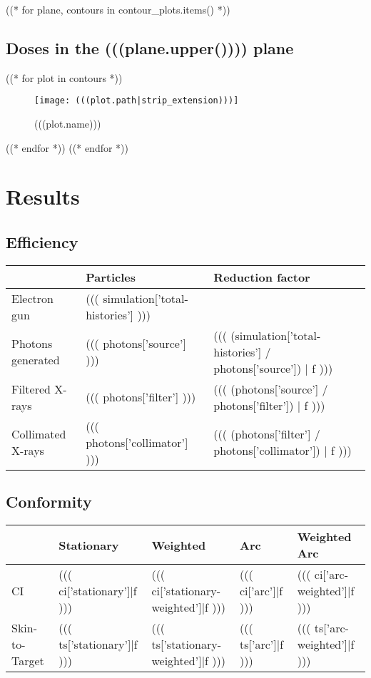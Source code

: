 \documentclass[12pt]{article}
\begin{document}

((* for plane, contours in contour_plots.items() *))
	\subsection{Doses in the (((plane.upper()))) plane}
	((* for plot in contours *))
	\begin{figure}[H]
	\centering
	\texttt{[image: (((plot.path|strip\_extension)))]}
	\caption{(((plot.name)))}
	\end{figure}
	((* endfor *))
((* endfor *))

\section{Results}

\subsection{Efficiency}

\begin{table}[H]
\begin{tabular}{l l l}
	& Particles & Reduction factor \\
	\hline
	Electron gun & ((( simulation['total-histories'] ))) & \\
	Photons generated & ((( photons['source'] ))) & ((( (simulation['total-histories'] / photons['source']) | f ))) \\
	Filtered X-rays & ((( photons['filter'] ))) & ((( (photons['source'] / photons['filter']) | f ))) \\
	Collimated X-rays & ((( photons['collimator'] ))) & ((( (photons['filter'] / photons['collimator']) | f )))
\end{tabular}
\end{table}

\subsection{Conformity}
\begin{table}[H]
\begin{tabular}{l l l l l}
	& Stationary & Weighted & Arc & Weighted Arc \\
	\hline
	CI & ((( ci['stationary']|f ))) & ((( ci['stationary-weighted']|f ))) & ((( ci['arc']|f ))) & ((( ci['arc-weighted']|f ))) \\
	Skin-to-Target & ((( ts['stationary']|f ))) & ((( ts['stationary-weighted']|f ))) & ((( ts['arc']|f ))) & ((( ts['arc-weighted']|f )))
\end{tabular}
\end{table}
\end{document}
